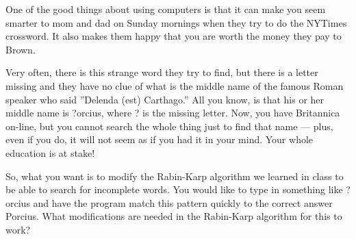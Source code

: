 One of the good things about using computers is that it can make you
seem smarter to mom and dad on Sunday mornings when they try to do the
NYTimes crossword.  It also makes them happy that you are worth the
money they pay to Brown.

Very often, there is this strange word they try to find, but there is a
letter missing and they have no clue of what is the middle name of the
famous Roman speaker who said ''Delenda (est) Carthago.''  All you know,
is that his or her middle name is  {\sf ?orcius}, where {\sf ?} is the
missing letter.  Now, you have Britannica on-line, but you cannot
search the whole thing just to find that name --- plus, even if you do,
it will not seem as if you had it in your mind.  Your whole education is
at stake!

So, what you want is to modify the Rabin-Karp algorithm we learned in
class to be able to search for incomplete words. You would like to type
in something like {\sf ?orcius} and have the program match this pattern
quickly to the correct answer {\sf Porcius}.  What modifications are
needed in the Rabin-Karp algorithm for this to work?

